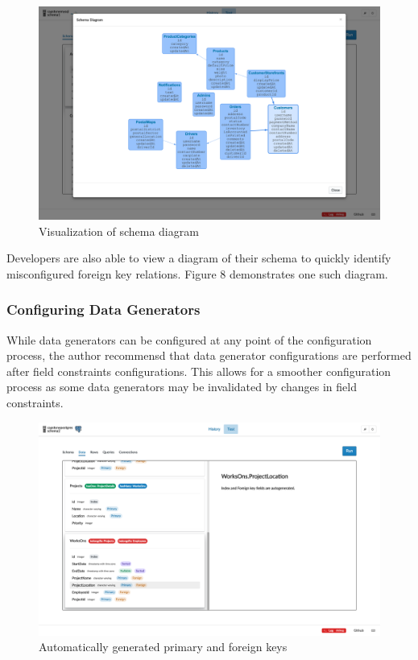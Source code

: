 \documentclass[12pt]{article}
\begin{document}
\begin{spacing}{1.9}
		
		\begin{figure}[H]
			\centering
			\includegraphics[width=\textwidth]{3-2-1d.png}
			\caption{Visualization of schema diagram }
			
		\end{figure}
		
		Developers are also able to view a diagram of their schema to quickly identify misconfigured foreign key relations. Figure 8 demonstrates one such diagram.
		
		\subsubsection{Configuring Data Generators}
		
		While data generators can be configured at any point of the configuration process, the author recommensd that data generator configurations are performed after field constraints configurations. This allows for a smoother configuration process as some data generators may be invalidated by changes in field constraints.
		
		
		\begin{figure}[H]
			\centering
			\includegraphics[width=\textwidth]{3-2-2.png}
			\caption{Automatically generated primary and foreign keys }
			

\end{figure}
\end{spacing}
\end{document}
